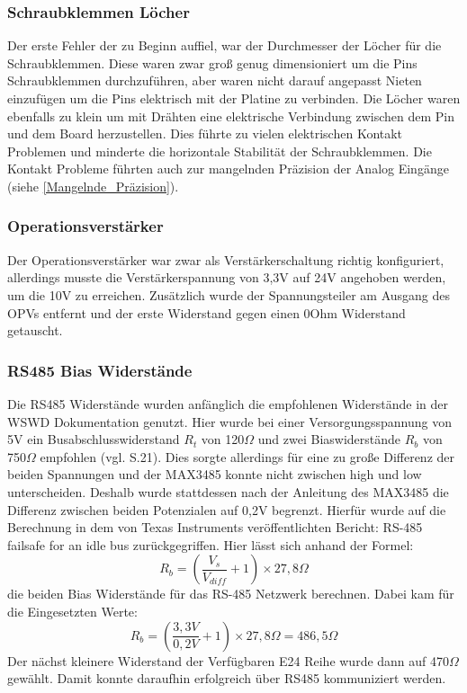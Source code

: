 \subsubsection{Schraubklemmen Löcher}
Der erste Fehler der zu Beginn auffiel, war der Durchmesser der Löcher für die Schraubklemmen. Diese waren zwar groß genug dimensioniert um die Pins Schraubklemmen durchzuführen, aber waren nicht darauf angepasst Nieten einzufügen um die Pins elektrisch mit der Platine zu verbinden. Die Löcher waren ebenfalls zu klein um mit Drähten eine elektrische Verbindung zwischen dem Pin und dem Board herzustellen. Dies führte zu vielen elektrischen Kontakt Problemen und minderte die horizontale Stabilität der Schraubklemmen. Die Kontakt Probleme führten auch zur mangelnden Präzision der Analog Eingänge (siehe \autoref{Mangelnde_Präzision}).
\subsubsection{Operationsverstärker}
Der Operationsverstärker war zwar als Verstärkerschaltung richtig konfiguriert, allerdings musste die Verstärkerspannung von 3,3V auf 24V angehoben werden, um die 10V zu erreichen. Zusätzlich wurde der Spannungsteiler am Ausgang des OPVs entfernt und der erste Widerstand gegen einen 0Ohm Widerstand getauscht.
\subsubsection{RS485 Bias Widerstände}
Die RS485 Widerstände wurden anfänglich die empfohlenen Widerstände in der WSWD Dokumentation genutzt. Hier wurde bei einer Versorgungsspannung von 5V ein Busabschlusswiderstand $R_t$ von 120$\Omega$ und zwei Biaswiderstände $R_b$ von 750$\Omega$ empfohlen (vgl.\cite{WSWD} S.21). Dies sorgte allerdings für eine zu große Differenz der beiden Spannungen und der MAX3485 konnte nicht zwischen high und low unterscheiden. Deshalb wurde stattdessen nach der Anleitung des MAX3485 die Differenz zwischen beiden Potenzialen auf 0,2V begrenzt. Hierfür wurde auf die Berechnung in dem von Texas Instruments veröffentlichten Bericht: \glqq{}RS-485 failsafe for an idle bus\grqq{} zurückgegriffen. Hier lässt sich anhand der Formel: 
\begin{equation}
	R_b = (\frac{V_s}{V_{diff }}+1)\times27,8\Omega
\end{equation}
die beiden Bias Widerstände für das RS-485 Netzwerk berechnen. Dabei kam für die Eingesetzten Werte:
\begin{equation}
	R_b = (\frac{3,3V}{0,2V}+1)\times27,8\Omega = 486,5\Omega
\end{equation}
Der nächst kleinere Widerstand der Verfügbaren E24 Reihe wurde dann auf 470$\Omega$ gewählt. Damit konnte daraufhin erfolgreich über RS485 kommuniziert werden.
